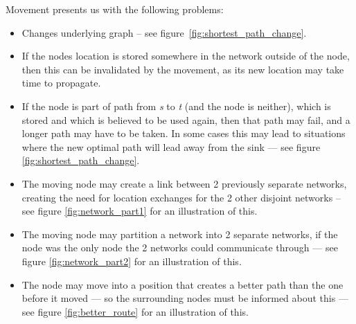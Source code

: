 Movement presents us with the following problems:



\begin{itemize}
\item Changes underlying graph -- see figure~\ref{fig:shortest_path_change}.
\item If the nodes location is stored somewhere in the network outside of the node, then this can be invalidated by the movement, as its new location may take time to propagate.
\item If the node is part of path from \emph{s} to \emph{t} (and the node is neither), which is stored and which is believed to be used again, then that path may fail, and a longer path may have to be taken. In some cases this may lead to situations where the new optimal path will lead away from the sink --- see figure \ref{fig:shortest_path_change}.
\item The moving node may create a link between 2 previously separate networks, creating the need for location exchanges for the 2 other disjoint networks -- see figure \ref{fig:network_part1} for an illustration of this.
\item The moving node may partition a network into 2 separate networks, if the node was the only node the 2 networks could communicate through --- see figure \ref{fig:network_part2} for an illustration of this.
\item The node may move into a position that creates a better path than the one before it moved --- so the surrounding nodes must be informed about this --- see figure \ref{fig:better_route} for an illustration of this.
\end{itemize}

